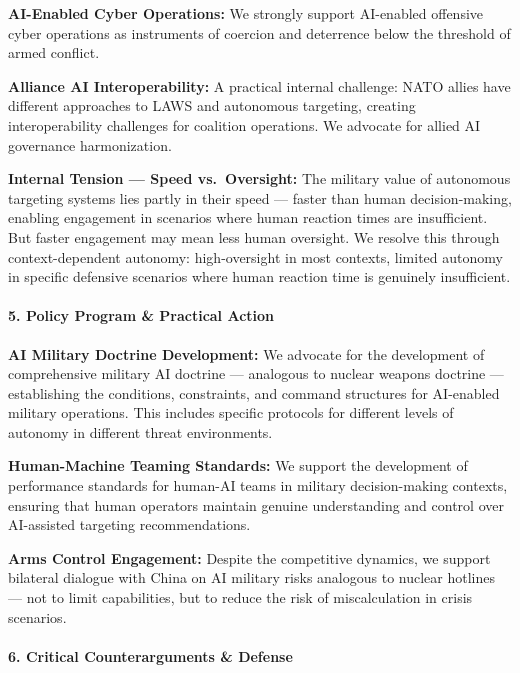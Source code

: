 \textbf{AI-Enabled Cyber Operations:} We strongly support AI-enabled
offensive cyber operations as instruments of coercion and deterrence
below the threshold of armed conflict.

\textbf{Alliance AI Interoperability:} A practical internal challenge:
NATO allies have different approaches to LAWS and autonomous targeting,
creating interoperability challenges for coalition operations. We
advocate for allied AI governance harmonization.

\textbf{Internal Tension --- Speed vs.~Oversight:} The military value of
autonomous targeting systems lies partly in their speed --- faster than
human decision-making, enabling engagement in scenarios where human
reaction times are insufficient. But faster engagement may mean less
human oversight. We resolve this through context-dependent autonomy:
high-oversight in most contexts, limited autonomy in specific defensive
scenarios where human reaction time is genuinely insufficient.

\paragraph{5. Policy Program \& Practical
Action}\label{policy-program-practical-action-23}

\textbf{AI Military Doctrine Development:} We advocate for the
development of comprehensive military AI doctrine --- analogous to
nuclear weapons doctrine --- establishing the conditions, constraints,
and command structures for AI-enabled military operations. This includes
specific protocols for different levels of autonomy in different threat
environments.

\textbf{Human-Machine Teaming Standards:} We support the development of
performance standards for human-AI teams in military decision-making
contexts, ensuring that human operators maintain genuine understanding
and control over AI-assisted targeting recommendations.

\textbf{Arms Control Engagement:} Despite the competitive dynamics, we
support bilateral dialogue with China on AI military risks analogous to
nuclear hotlines --- not to limit capabilities, but to reduce the risk
of miscalculation in crisis scenarios.

\paragraph{6. Critical Counterarguments \&
Defense}\label{critical-counterarguments-defense-23}

